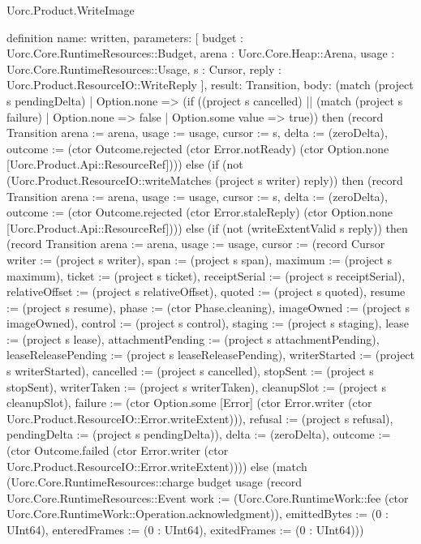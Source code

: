 \begin{lexlean}{Uorc.Product.WriteImage}
\begin{semanticmodule}
definition{
  name: written,
  parameters: [
    budget : Uorc.Core.RuntimeResources::Budget,
    arena : Uorc.Core.Heap::Arena,
    usage : Uorc.Core.RuntimeResources::Usage,
    s : Cursor,
    reply : Uorc.Product.ResourceIO::WriteReply
  ],
  result: Transition,
  body: (match (project s pendingDelta)
    | Option.none => (if ((project s cancelled) || (match (project s failure)
      | Option.none => false
      | Option.some value => true)) then (record Transition {arena := arena, usage := usage, cursor := s, delta := (zeroDelta), outcome := (ctor Outcome.rejected (ctor Error.notReady) (ctor Option.none [Uorc.Product.Api::ResourceRef]))}) else (if (not (Uorc.Product.ResourceIO::writeMatches (project s writer) reply)) then (record Transition {arena := arena, usage := usage, cursor := s, delta := (zeroDelta), outcome := (ctor Outcome.rejected (ctor Error.staleReply) (ctor Option.none [Uorc.Product.Api::ResourceRef]))}) else (if (not (writeExtentValid s reply)) then (record Transition {arena := arena, usage := usage, cursor := (record Cursor {writer := (project s writer), span := (project s span), maximum := (project s maximum), ticket := (project s ticket), receiptSerial := (project s receiptSerial), relativeOffset := (project s relativeOffset), quoted := (project s quoted), resume := (project s resume), phase := (ctor Phase.cleaning), imageOwned := (project s imageOwned), control := (project s control), staging := (project s staging), lease := (project s lease), attachmentPending := (project s attachmentPending), leaseReleasePending := (project s leaseReleasePending), writerStarted := (project s writerStarted), cancelled := (project s cancelled), stopSent := (project s stopSent), writerTaken := (project s writerTaken), cleanupSlot := (project s cleanupSlot), failure := (ctor Option.some [Error] (ctor Error.writer (ctor Uorc.Product.ResourceIO::Error.writeExtent))), refusal := (project s refusal), pendingDelta := (project s pendingDelta)}), delta := (zeroDelta), outcome := (ctor Outcome.failed (ctor Error.writer (ctor Uorc.Product.ResourceIO::Error.writeExtent)))}) else (match (Uorc.Core.RuntimeResources::charge budget usage (record Uorc.Core.RuntimeResources::Event {work := (Uorc.Core.RuntimeWork::fee (ctor Uorc.Core.RuntimeWork::Operation.acknowledgment)), emittedBytes := (0 : UInt64), enteredFrames := (0 : UInt64), exitedFrames := (0 : UInt64)}))
}
\end{semanticmodule}
\end{lexlean}
